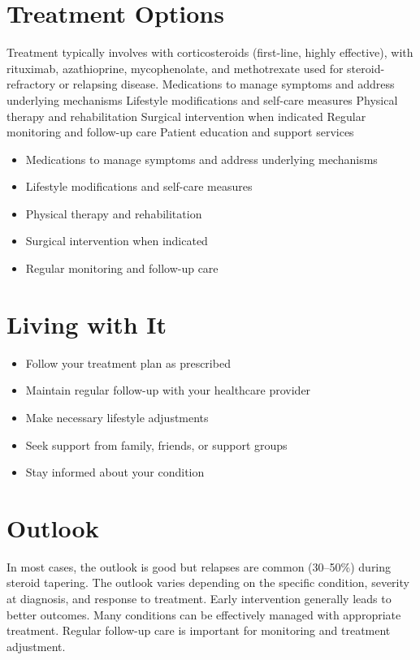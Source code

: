 \section{Treatment Options}
Treatment typically involves with corticosteroids (first-line, highly effective), with rituximab, azathioprine, mycophenolate, and methotrexate used for steroid-refractory or relapsing disease. Medications to manage symptoms and address underlying mechanisms Lifestyle modifications and self-care measures Physical therapy and rehabilitation Surgical intervention when indicated Regular monitoring and follow-up care Patient education and support services

\begin{itemize}[noitemsep]
  \item Medications to manage symptoms and address underlying mechanisms
  \item Lifestyle modifications and self-care measures
  \item Physical therapy and rehabilitation
  \item Surgical intervention when indicated
  \item Regular monitoring and follow-up care
\end{itemize}
\section{Living with It}
\begin{itemize}[noitemsep]
  \item Follow your treatment plan as prescribed
  \item Maintain regular follow-up with your healthcare provider
  \item Make necessary lifestyle adjustments
  \item Seek support from family, friends, or support groups
  \item Stay informed about your condition
\end{itemize}
\section{Outlook}
In most cases, the outlook is good but relapses are common (30--50\%) during steroid tapering. The outlook varies depending on the specific condition, severity at diagnosis, and response to treatment. Early intervention generally leads to better outcomes. Many conditions can be effectively managed with appropriate treatment. Regular follow-up care is important for monitoring and treatment adjustment.
